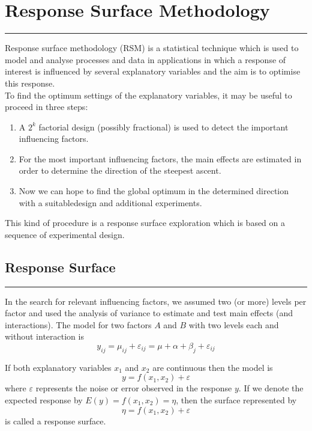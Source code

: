 \section{Response Surface Methodology}
\noindent\rule[\linienAbstand]{\linewidth}{\linienDickeDick}

Response surface methodology (RSM) is a statistical technique which is used to model and analyse processes and data in applications in which a response of interest is influenced by several explanatory variables and the aim is to optimise this response.\\
To find the optimum settings of the explanatory variables, it may be useful to proceed in three steps:
\begin{enumerate}
  \item A $2^k$ factorial design (possibly fractional) is used to detect the important influencing factors.
  \item For the most important influencing factors, the main effects are estimated in order to determine the direction of the steepest ascent.
  \item Now we can hope to find the global optimum in the determined direction with a suitabledesign and additional experiments.
\end{enumerate}
This kind of procedure is a response surface exploration which is based on a sequence of experimental design.


\subsection{Response Surface}
\noindent\rule[\linienAbstand]{\linewidth}{\linienDicke}
In the search for relevant influencing factors, we assumed two (or more) levels per factor and used the analysis of variance to estimate and test main effects (and interactions). The model for two factors $A$ and $B$ with two levels each and without interaction is
\begin{equation}
  y_{ij} = \mu_{ij} + \varepsilon_{ij} = \mu + \alpha + \beta_j + \varepsilon_{ij}
\end{equation}

If both explanatory variables $x_1$ and $x_2$ are continuous then the model is
\begin{equation}
  y = f(x_1, x_2) + \varepsilon
\end{equation}
where $\varepsilon$ represents the noise or error observed in the response $y$.
If we denote the expected response by $E(y) = f(x_1, x_2) = \eta$, then the surface represented by
\begin{equation}
  \eta = f(x_1, x_2) + \varepsilon
\end{equation}
is called a response surface.

